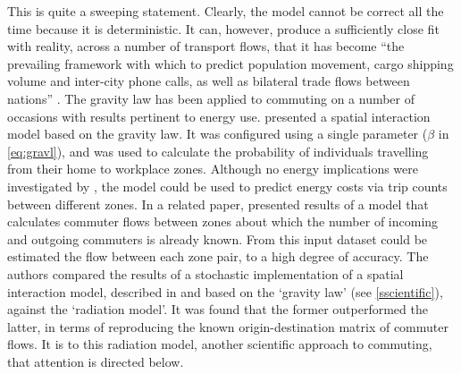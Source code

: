 \documentclass[a4paper, 11pt, twoside]{Thesis}
\begin{document}
This is quite a sweeping statement. Clearly, the model cannot be correct all
the time because it is deterministic. It can, however, produce a
sufficiently close fit with reality, across a number of transport flows, that it
has become ``the prevailing framework with which to predict population movement,
cargo shipping volume and inter-city phone calls, as well as bilateral trade
flows between nations'' \citep{Simini2012}. The gravity law has been applied to
commuting on a number of occasions with results pertinent to energy use.
\citet{gargiulo2012} presented a spatial interaction model based on the
gravity law. It was configured using a single parameter ($\beta$ in \cref{eq:gravl}),
and was used to calculate the probability of individuals travelling
from their home to workplace zones. Although no energy implications were investigated
by \citet{gargiulo2012}, the model could be used to
predict energy costs via trip counts between different zones.
In a related paper, \citet{Lenormandplosone2012} presented results of
a model that calculates commuter flows between zones about which the number
of incoming and outgoing commuters is already known. From this input dataset
could be estimated the flow between each zone pair, to a high degree of accuracy.
The authors compared the results of a stochastic implementation of a spatial interaction
model, described in \citep{Gargiulo2011} and based on the `gravity law' (see \cref{sscientific}),
against the `radiation model'. It was found that the former outperformed the latter,
in terms of reproducing the known origin-destination matrix of commuter flows. It is to
this radiation model, another scientific approach to commuting, 
that attention is directed below.
\end{document}
